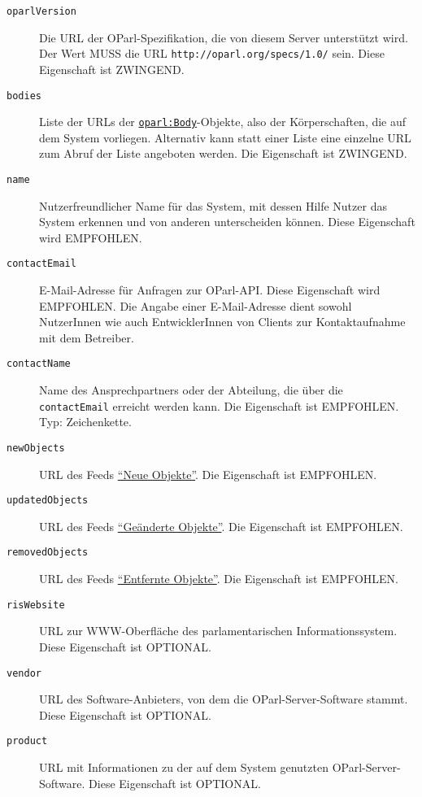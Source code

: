 \documentclass[,a4paper]{article}
\begin{document}
\begin{description}
\item[\texttt{oparlVersion}]
Die URL der OParl-Spezifikation, die von diesem Server unterstützt wird.
Der Wert MUSS die URL \texttt{http://oparl.org/specs/1.0/} sein. Diese
Eigenschaft ist ZWINGEND.
\item[\texttt{bodies}]
Liste der URLs der
\hyperref[oparlux5fbody]{\texttt{oparl:Body}}-Objekte, also der
Körperschaften, die auf dem System vorliegen. Alternativ kann statt
einer Liste eine einzelne URL zum Abruf der Liste angeboten werden. Die
Eigenschaft ist ZWINGEND.
\item[\texttt{name}]
Nutzerfreundlicher Name für das System, mit dessen Hilfe Nutzer das
System erkennen und von anderen unterscheiden können. Diese Eigenschaft
wird EMPFOHLEN.
\item[\texttt{contactEmail}]
E-Mail-Adresse für Anfragen zur OParl-API. Diese Eigenschaft wird
EMPFOHLEN. Die Angabe einer E-Mail-Adresse dient sowohl NutzerInnen wie
auch EntwicklerInnen von Clients zur Kontaktaufnahme mit dem Betreiber.
\item[\texttt{contactName}]
Name des Ansprechpartners oder der Abteilung, die über die
\texttt{contactEmail} erreicht werden kann. Die Eigenschaft ist
EMPFOHLEN. Typ: Zeichenkette.
\item[\texttt{newObjects}]
URL des Feeds \hyperref[feedux5fneueux5fobjekte]{``Neue Objekte''}. Die
Eigenschaft ist EMPFOHLEN.
\item[\texttt{updatedObjects}]
URL des Feeds \hyperref[feedux5fgeaenderteux5fobjekte]{``Geänderte
Objekte''}. Die Eigenschaft ist EMPFOHLEN.
\item[\texttt{removedObjects}]
URL des Feeds \hyperref[feedux5fentfernteux5fobjekte]{``Entfernte
Objekte''}. Die Eigenschaft ist EMPFOHLEN.
\item[\texttt{risWebsite}]
URL zur WWW-Oberfläche des parlamentarischen Informationssystem. Diese
Eigenschaft ist OPTIONAL.
\item[\texttt{vendor}]
URL des Software-Anbieters, von dem die OParl-Server-Software stammt.
Diese Eigenschaft ist OPTIONAL.
\item[\texttt{product}]
URL mit Informationen zu der auf dem System genutzten
OParl-Server-Software. Diese Eigenschaft ist OPTIONAL.
\end{description}

\end{document}
